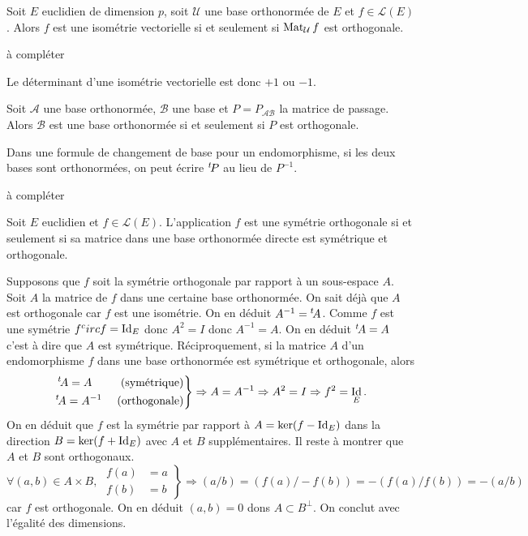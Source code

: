 \begin{propn}
 Soit $E$ euclidien de dimension $p$, soit $\mathcal U$ une base orthonormée de $E$ et $f\in \mathcal L(E)$. Alors $f$ est une isométrie vectorielle si et seulement si $\mathop{\mathrm{Mat}}_{\mathcal U}f$ est orthogonale.
\end{propn}
\begin{demo}
 à compléter
\end{demo}
\begin{rem}
  Le déterminant d'une isométrie vectorielle est donc $+1$ ou $-1$.
\end{rem}
\clearpage
\begin{propn}
  Soit $\mathcal{A}$ une base orthonormée, $\mathcal{B}$ une base et $P=P_{\mathcal{A} \mathcal{B}}$ la matrice de passage. Alors $\mathcal{B}$ est une base orthonormée si et seulement si $P$ est orthogonale. 
\end{propn}
\begin{rem}
  Dans une formule de changement de base pour un endomorphisme, si les deux bases sont orthonormées, on peut écrire $\mathstrut^t\! P$ au lieu de $P^{-1}$.
\end{rem}
\begin{demo}
 à compléter
\end{demo}

\begin{prop}
 Soit $E$ euclidien et $f\in \mathcal L(E)$. L'application $f$ est une symétrie orthogonale si et seulement si sa matrice dans une base orthonormée directe est symétrique et orthogonale.
\end{prop}
\begin{demo}
  Supposons que $f$ soit la symétrie orthogonale par rapport à un sous-espace $A$. Soit $A$ la matrice de $f$ dans une certaine base orthonormée. On sait déjà que $A$ est orthogonale car $f$ est une isométrie. On en déduit $A^{-1} = \mathstrut^t\! A$. Comme $f$ est une symétrie $f^circ f= \mathop{\mathrm{Id}}_E$ donc $A^2 = I$ donc $A^{-1} = A$. On en déduit $\mathstrut^t\! A = A$ c'est à dire que $A$ est symétrique.\newline
  Réciproquement, si la matrice $A$ d'un endomorphisme $f$ dans une base orthonormée est symétrique et orthogonale, alors
  \[
   \left. 
   \begin{aligned}
    &\mathstrut^t\! A = A &\text{ (symétrique)}\\ \mathstrut^t\! &A = A^{-1} &\text{ (orthogonale)}
   \end{aligned}
\right\rbrace \Rightarrow A = A^{-1} \Rightarrow A^2 = I \Rightarrow f^2 = \mathop{\mathrm{Id}}_E.
  \]
On en déduit que $f$ est la symétrie par rapport à $A=\ker(f-\mathop{\mathrm{Id}}_E)$ dans la direction $B = \ker(f+\mathop{\mathrm{Id}}_E)$ avec $A$ et $B$ supplémentaires. Il reste à montrer que $A$ et $B$ sont orthogonaux.
\[
 \forall (a,b)\in A\times B,\;
 \left. 
 \begin{aligned}
  f(a) &= a \\ f(b) &= b
 \end{aligned}
\right\rbrace 
\Rightarrow (a/b) = (f(a)/-f(b)) = -(f(a)/f(b)) = -(a/b)
\]
car $f$ est orthogonale. On en déduit $(a,b)=0$ dons $A \subset B^{\bot}$. On conclut avec l'égalité des dimensions. 
\end{demo}

